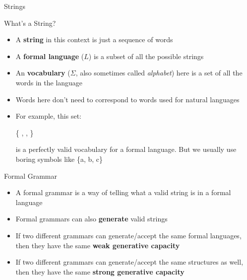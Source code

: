 \documentclass{beamer}
\begin{document}
\begin{frame}{Strings}
\begin{block}{What's a String?}
\begin{itemize}
	\item A \textbf{string} in this context is just a sequence of words
	\pause
	\item A \textbf{formal language} ($L$) is a subset of all the possible strings
	\pause
	\item An \textbf{vocabulary} ($\Sigma$, also sometimes called \textit{alphabet}) here is a set of all the words in the language
	\pause
	\item Words here don't need to correspond to words used for natural languages
	\pause
	\item For example, this set:\\
	\begin{center}
	{\LARGE \{ \Smiley[][cyan], \Springtree, \Snowman \}}\\
	\end{center}
	is a perfectly valid vocabulary for a formal language. \pause But we usually use boring symbols like \{a, b, c\}
\end{itemize}
\end{block}
\end{frame}


\begin{frame}{Formal Grammar}
\begin{block}{}
\begin{itemize}
	\item A formal grammar is a way of telling what a valid string is in a formal language
	\item Formal grammars can also \textbf{generate} valid strings
	\pause
	\item If two different grammars can generate/accept the same formal languages, then they have the same \textbf{weak generative capacity}
	\pause
	\item If two different grammars can generate/accept the same structures as well, then they have the same \textbf{strong generative capacity}
\end{itemize}
\end{block}
\end{frame}
\end{document}
